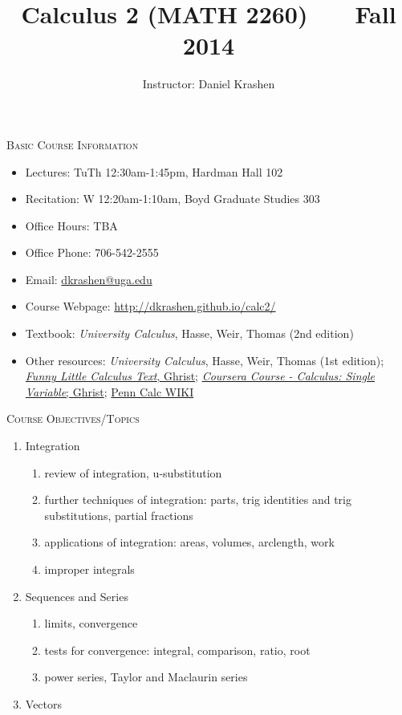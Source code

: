 \documentclass[12pt]{amsart}
\title{Calculus 2 (MATH 2260) \ \ \ Fall 2014}
\author{Instructor: Daniel Krashen}
\begin{document}
\vspace{-2cm}
\maketitle


\thispagestyle{empty}
\noindent
\textsc{Basic Course Information}

\begin{itemize}
\item
Lectures: TuTh 12:30am-1:45pm, Hardman Hall 102
\item
Recitation: W 12:20am-1:10am, Boyd Graduate Studies 303
\item 
Office Hours: TBA 
\item
Office Phone: 706-542-2555 
\item
Email: \url{dkrashen@uga.edu} 
\item
Course Webpage:  
\url{http://dkrashen.github.io/calc2/} 
\item
Textbook: \textit{University Calculus}, Hasse, Weir, Thomas (2nd edition)
\item
Other resources: 
\textit{University Calculus}, Hasse, Weir, Thomas (1st edition);
\href{http://www.math.upenn.edu/~ghrist/FLCT/}{\textit{Funny Little
Calculus Text}, Ghrist};
\href{https://class.coursera.org/calcsing-005/lecture/preview}{\textit{Coursera
Course -  Calculus: Single Variable}; Ghrist};
\href{http://calculus.seas.upenn.edu/}{Penn Calc WIKI}
\end{itemize}

\medskip

\noindent
\textsc{Course Objectives/Topics}
\begin{enumerate}
\item Integration
\begin{enumerate}
\item review of integration, u-substitution
\item further techniques of integration: parts, trig identities and trig
substitutions, partial fractions
\item applications of integration: areas, volumes, arclength, work
\item improper integrals
\end{enumerate}
\item Sequences and Series
\begin{enumerate}
\item limits, convergence
\item tests for convergence: integral, comparison, ratio, root
\item power series, Taylor and Maclaurin series
\end{enumerate}
\item Vectors
\end{enumerate}
\end{document}
